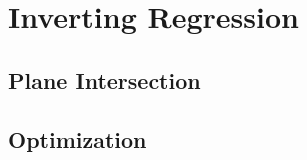 \section{Inverting Regression}


\subsection{Plane Intersection}
   \cite{patrikalakis1993surface}



\subsection{Optimization}



